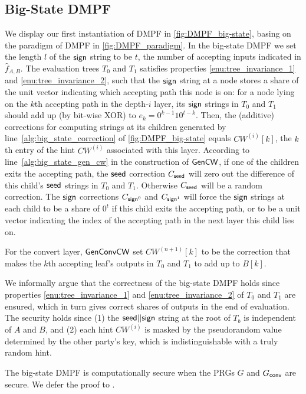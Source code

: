\subsection{Big-State DMPF}\label{sec:big_state_DMPF}
We display our first instantiation of DMPF in \cref{fig:DMPF_big-state}, basing on the paradigm of DMPF in \cref{fig:DMPF_paradigm}. In the big-state DMPF we set the length $l$ of the ${\sf sign}$ string to be $t$, the number of accepting inputs indicated in $\hat{f}_{A,B}$. The evaluation trees $T_0$ and $T_1$ satisfies properties \ref{enu:tree_invariance_1} and \ref{enu:tree_invariance_2}, such that the ${\sf sign}$ string at a node stores a share of the unit vector indicating which accepting path this node is on: for a node lying on the $k$th accepting path in the depth-$i$ layer, its ${\sf sign}$ strings in $T_0$ and $T_1$ should add up (by bit-wise XOR) to $e_k = 0^{k-1}10^{t-k}$. Then, the (additive) corrections for computing strings at its children generated by line~\ref{alg:big_state_correction} of \cref{fig:DMPF_big-state} equals $CW^{(i)}[k]$, the $k$th entry of the hint $CW^{(i)}$ associated with this layer. According to line~\ref{alg:big_state_gen_cw} in the construction of $\sf GenCW$, if one of the children exits the accepting path, the ${\sf seed}$ correction $C_{\sf seed}$ will zero out the difference of this child's ${\sf seed}$ strings in $T_0$ and $T_1$. Otherwise $C_{\sf seed}$ will be a random correction. The ${\sf sign}$ corrections $C_{{\sf sign}^0}$ and $C_{{\sf sign}^1}$ will force the ${\sf sign}$ strings at each child to be a share of $0^t$ if this child exits the accepting path, or to be a unit vector indicating the index of the accepting path in the next layer this child lies on. 

For the convert layer, $\sf GenConvCW$ set $CW^{(n+1)}[k]$ to be the correction that makes the $k$th accepting leaf's outputs in $T_0$ and $T_1$ to add up to $B[k]$. 



We informally argue that the correctness of the big-state DMPF holds since properties \ref{enu:tree_invariance_1} and \ref{enu:tree_invariance_2} of $T_0$ and $T_1$ are ensured, which in turn gives correct shares of outputs in the end of evaluation. The security holds since (1) the ${\sf seed}||{\sf sign}$ string at the root of $T_b$ is independent of $A$ and $B$, and (2) each hint $CW^{(i)}$ is masked by the pseudorandom value determined by the other party's key, which is indistinguishable with a truly random hint. 

The big-state DMPF is computationally secure when the PRGs $G$ and $G_{\sf conv}$ are secure. We defer the proof to . 


